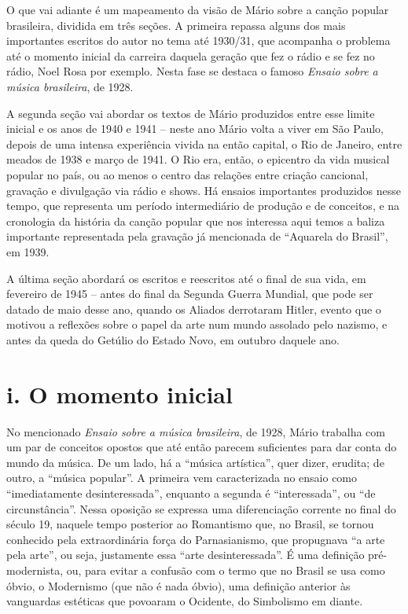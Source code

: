 O que vai adiante é um mapeamento da visão de Mário sobre a canção
popular brasileira, dividida em três seções. A primeira repassa alguns
dos mais importantes escritos do autor no tema até 1930/31, que
acompanha o problema até o momento inicial da carreira daquela geração
que fez o rádio e se fez no rádio, Noel Rosa por exemplo. Nesta fase se
destaca o famoso \emph{Ensaio sobre a música brasileira}, de 1928.

A segunda seção vai abordar os textos de Mário produzidos entre esse
limite inicial e os anos de 1940 e 1941 -- neste ano Mário volta a viver
em São Paulo, depois de uma intensa experiência vivida na então capital,
o Rio de Janeiro, entre meados de 1938 e março de 1941. O Rio era,
então, o epicentro da vida musical popular no país, ou ao menos o centro
das relações entre criação cancional, gravação e divulgação via rádio e
shows. Há ensaios importantes produzidos nesse tempo, que representa um
período intermediário de produção e de conceitos, e na cronologia da
história da canção popular que nos interessa aqui temos a baliza
importante representada pela gravação já mencionada de ``Aquarela do
Brasil'', em 1939.

A última seção abordará os escritos e reescritos até o final de sua
vida, em fevereiro de 1945 -- antes do final da Segunda Guerra Mundial,
que pode ser datado de maio desse ano, quando os Aliados derrotaram
Hitler, evento que o motivou a reflexões sobre o papel da arte num mundo
assolado pelo nazismo, e antes da queda do Getúlio do Estado Novo, em
outubro daquele ano.

\section{i. O momento inicial}

No mencionado \emph{Ensaio sobre a música brasileira}, de 1928, Mário
trabalha com um par de conceitos opostos que até então parecem
suficientes para dar conta do mundo da música. De um lado, há a ``música
artística'', quer dizer, erudita; de outro, a ``música popular''. A
primeira vem caracterizada no ensaio como ``imediatamente
desinteressada'', enquanto a segunda é ``interessada'', ou ``de
circunstância''. Nessa oposição se expressa uma diferenciação corrente
no final do século 19, naquele tempo posterior ao Romantismo que, no
Brasil, se tornou conhecido pela extraordinária força do Parnasianismo,
que propugnava ``a arte pela arte'', ou seja, justamente essa ``arte
desinteressada''. É uma definição pré-modernista, ou, para evitar a
confusão com o termo que no Brasil se usa como óbvio, o Modernismo (que
não é nada óbvio), uma definição anterior às vanguardas estéticas que
povoaram o Ocidente, do Simbolismo em diante.

